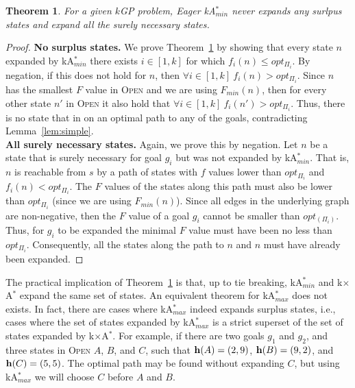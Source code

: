 \documentclass{aicom2e}
\newtheorem{theorem}{Theorem}
\newcommand{\kgs}{$k$GP}
\newcommand{\kastarmin}{kA$^*_{min}$}
\newcommand{\kastarmax}{kA$^*_{max}$}
\newcommand{\kxastar}{k$\times$A$^*$}
\newcommand{\minf}{$F_{min}(n)$}
\newcommand{\open}{\textsc{Open}}
\begin{document}
\begin{theorem}
	For a given \kgs{} problem, Eager \kastarmin{} never expands any surlpus states and 
	expand all the surely necessary states. 
	\label{the:kastarmin-effective}
\end{theorem}
\begin{proof}
	{\bf No surplus states.} 	We prove Theorem~\ref{the:kastarmin-effective} by showing that every state $n$ 
	expanded by \kastarmin{} there exists $i\in [1,k]$ for which $f_i(n)\leq opt_{\Pi_i}$. 
	By negation, if this does not hold for $n$, then $\forall i\in[1,k]~f_i(n)>opt_{\Pi_i}$. 
	Since $n$ has the smallest $F$ value in \open{} and we are using \minf{}, then 
	for every other state $n'$ in \open{} it also hold that $\forall i\in[1,k]~f_i(n')>opt_{\Pi_i}$. 
	Thus, there is no state that in on an optimal path to any of the goals, contradicting Lemma~\ref{lem:simple}. \\
	
	{\bf All surely necessary states.} Again, we prove this by negation. Let $n$ be a state 
	that is surely necessary for goal $g_i$ but was not expanded by \kastarmin{}. 
	That is, $n$ is reachable from $s$ by a path of states with $f$ values lower than $opt_{\Pi_i}$ 
	and $f_i(n)<opt_{\Pi_i}$. The $F$ values of the states along this path must also be lower than $opt_{\Pi_i}$ (since we are using \minf). Since all edges in the underlying graph are non-negative, then the $F$ value of a goal $g_i$ cannot be smaller than $opt_(\Pi_i)$. Thus, for $g_i$ to be expanded the minimal $F$ value must have been no less than $opt_{\Pi_i}$. Consequently, all the states along the path to $n$ and $n$ must have already been expanded. 
\end{proof}
The practical implication of Theorem~\ref{the:kastarmin-effective} is that, up to tie breaking, 
\kastarmin{} and \kxastar{} expand the same set of states. 
An equivalent theorem for \kastarmax{} does not exists. In fact, there are cases where \kastarmax{} indeed expands surplus states,
i.e., cases where the set of states
expanded by \kastarmax{} is a strict superset of the set of states expanded by
\kxastar{}. For example, if there are two goals $g_1$ and $g_2$, and three
states in \open{} $A$, $B$, and $C$, such that ${\bf h}(A)=(2,9)$, ${\bf
h}(B)=(9,2)$, and ${\bf h}(C)=(5,5)$. The optimal path may be found without
expanding $C$, but using \kastarmax{} we will choose $C$ before $A$ and $B$.


\end{document}
